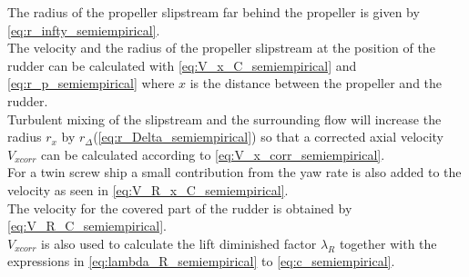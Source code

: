 The radius of the propeller slipstream far behind the propeller is given by \autoref{eq:r_infty_semiempirical}.
\begin{equation}
    \label{eq:r_infty_semiempirical}
    
\end{equation}
The velocity and the radius of the propeller slipstream at the position of the rudder can be calculated with \autoref{eq:V_x_C_semiempirical} and \autoref{eq:r_p_semiempirical} where $x$ is the distance between the propeller and the rudder.
\begin{equation}
    \label{eq:V_x_C_semiempirical}
    
\end{equation}
%
\begin{equation}
    \label{eq:r_p_semiempirical}
    
\end{equation}
Turbulent mixing of the slipstream and the surrounding flow will increase the radius $r_x$ by $r_\Delta$(\autoref{eq:r_Delta_semiempirical}) so that a corrected axial velocity $V_{xcorr}$ can be calculated according to \autoref{eq:V_x_corr_semiempirical}.
\begin{equation}
    \label{eq:r_Delta_semiempirical}
    
\end{equation}
%
\begin{equation}
    \label{eq:V_x_corr_semiempirical}
    
\end{equation}
For a twin screw ship a small contribution from the yaw rate is also added to the velocity as seen in \autoref{eq:V_R_x_C_semiempirical}.
\begin{equation}
    \label{eq:V_R_x_C_semiempirical}
    
\end{equation}
The velocity for the covered part of the rudder is obtained by \autoref{eq:V_R_C_semiempirical}.
\begin{equation}
    \label{eq:V_R_C_semiempirical}
    
\end{equation}
$V_{xcorr}$ is also used to calculate the lift diminished factor $\lambda_R$ together with the expressions in  \autoref{eq:lambda_R_semiempirical} to \autoref{eq:c_semiempirical}.
\begin{equation}
    \label{eq:lambda_R_semiempirical}
    
\end{equation}
